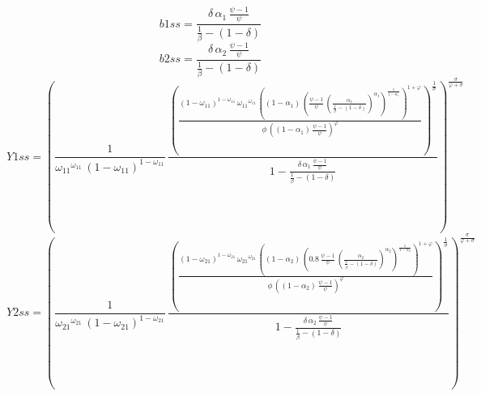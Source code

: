 \begin{dmath*}
b1ss = \frac{{{\delta}}\, {{\alpha_{1}}}\, \frac{{{\psi}}-1}{{{\psi}}}}{\frac{1}{{{\beta}}}-\left(1-{{\delta}}\right)}
\end{dmath*}
\begin{dmath*}
b2ss = \frac{{{\delta}}\, {{\alpha_{2}}}\, \frac{{{\psi}}-1}{{{\psi}}}}{\frac{1}{{{\beta}}}-\left(1-{{\delta}}\right)}
\end{dmath*}
\begin{dmath*}
Y1ss = \left(\frac{1}{{{\omega_{11}}}^{{{\omega_{11}}}}\, \left(1-{{\omega_{11}}}\right)^{1-{{\omega_{11}}}}}\, \frac{\left(\frac{\left(1-{{\omega_{11}}}\right)^{1-{{\omega_{11}}}}\, {{\omega_{11}}}^{{{\omega_{11}}}}\, \left(\left(1-{{\alpha_{1}}}\right)\, \left(\frac{{{\psi}}-1}{{{\psi}}}\, \left(\frac{{{\alpha_{1}}}}{\frac{1}{{{\beta}}}-\left(1-{{\delta}}\right)}\right)^{{{\alpha_{1}}}}\right)^{\frac{1}{1-{{\alpha_{1}}}}}\right)^{1+{{\varphi}}}}{{{\phi}}\, \left(\left(1-{{\alpha_{1}}}\right)\, \frac{{{\psi}}-1}{{{\psi}}}\right)^{{{\varphi}}}}\right)^{\frac{1}{{{\sigma}}}}}{1-\frac{{{\delta}}\, {{\alpha_{1}}}\, \frac{{{\psi}}-1}{{{\psi}}}}{\frac{1}{{{\beta}}}-\left(1-{{\delta}}\right)}}\right)^{\frac{{{\sigma}}}{{{\varphi}}+{{\sigma}}}}
\end{dmath*}
\begin{dmath*}
Y2ss = \left(\frac{1}{{{\omega_{21}}}^{{{\omega_{21}}}}\, \left(1-{{\omega_{21}}}\right)^{1-{{\omega_{21}}}}}\, \frac{\left(\frac{\left(1-{{\omega_{21}}}\right)^{1-{{\omega_{21}}}}\, {{\omega_{21}}}^{{{\omega_{21}}}}\, \left(\left(1-{{\alpha_{2}}}\right)\, \left(0.8\, \frac{{{\psi}}-1}{{{\psi}}}\, \left(\frac{{{\alpha_{2}}}}{\frac{1}{{{\beta}}}-\left(1-{{\delta}}\right)}\right)^{{{\alpha_{2}}}}\right)^{\frac{1}{1-{{\alpha_{2}}}}}\right)^{1+{{\varphi}}}}{{{\phi}}\, \left(\left(1-{{\alpha_{2}}}\right)\, \frac{{{\psi}}-1}{{{\psi}}}\right)^{{{\varphi}}}}\right)^{\frac{1}{{{\sigma}}}}}{1-\frac{{{\delta}}\, {{\alpha_{2}}}\, \frac{{{\psi}}-1}{{{\psi}}}}{\frac{1}{{{\beta}}}-\left(1-{{\delta}}\right)}}\right)^{\frac{{{\sigma}}}{{{\varphi}}+{{\sigma}}}}
\end{dmath*}
